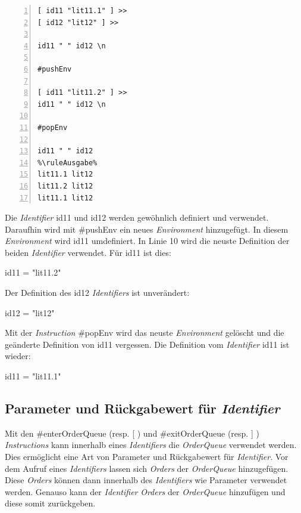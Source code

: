 \begin{minipage}{\linewidth}
\begin{multicols}{2}
\begin{lstlisting}[language=QHS, caption=Beispiel zu \textit{Environments}, numbers=left, stepnumber=1]
%\ruleEingabe%
[ id11 "lit11.1" ] >>
[ id12 "lit12" ] >>

id11 " " id12 \n

#pushEnv

[ id11 "lit11.2" ] >>
id11 " " id12 \n

#popEnv

id11 " " id12
%\ruleAusgabe%
lit11.1 lit12
lit11.2 lit12
lit11.1 lit12
\end{lstlisting}
\columnbreak
Die \textit{Identifier} {\selectListingFont id11} und {\selectListingFont id12} werden gewöhnlich definiert und verwendet. Daraufhin wird mit {\selectListingFont \#pushEnv} ein neues \textit{Environment} hinzugefügt.
In diesem \textit{Environment} wird {\selectListingFont id11} umdefiniert. In Linie 10 wird die neuste Definition der beiden \textit{Identifier} verwendet. Für {\selectListingFont id11} ist dies: \break
\centerline{\selectListingFont id11 = "lit11.2"}
Der Definition des {\selectListingFont id12} \textit{Identifiers} ist unverändert: \break
\centerline{\selectListingFont id12 = "lit12"}
Mit der \textit{Instruction} {\selectListingFont \#popEnv} wird das neuste \textit{Environment} gelöscht und die geänderte Definition von {\selectListingFont id11} vergessen.
Die Definition vom \textit{Identifier} {\selectListingFont id11} ist wieder:
\centerline{\selectListingFont id11 = "lit11.1"}
\end{multicols}
\end{minipage}



\subsection{Parameter und Rückgabewert für \textit{Identifier}}
Mit den {\listingFont\selectfont \#enterOrderQueue} (resp. {\listingFont\selectfont [} ) und {\listingFont\selectfont \#exitOrderQueue} (resp. {\listingFont\selectfont ]} ) \textit{Instructions}
kann innerhalb eines \textit{Identifiers} die \textit{OrderQueue} verwendet werden.
Dies ermöglicht eine Art von Parameter und Rückgabewert für \textit{Identifier}.
Vor dem Aufruf eines \textit{Identifiers} lassen sich \textit{Orders} der \textit{OrderQueue} hinzugefügen. Diese \textit{Orders} können dann innerhalb des \textit{Identifiers} wie Parameter verwendet werden.
Genauso kann der \textit{Identifier} \textit{Orders} der \textit{OrderQueue} hinzufügen und diese somit zurückgeben.

